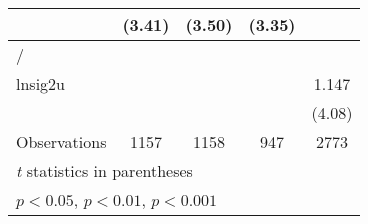 {\begin{tabular}{l*{4}{c}}
                &   (3.41)         &   (3.50)         &   (3.35)         &                  \\
\hline
/               &                  &                  &                  &                  \\
lnsig2u         &                  &                  &                  &    1.147\sym{***}\\
                &                  &                  &                  &   (4.08)         \\
\hline
Observations    &     1157         &     1158         &      947         &     2773         \\
\hline\hline
\multicolumn{5}{l}{\footnotesize \textit{t} statistics in parentheses}\\
\multicolumn{5}{l}{\footnotesize \sym{*} \(p<0.05\), \sym{**} \(p<0.01\), \sym{***} \(p<0.001\)}\\
\end{tabular}
}
